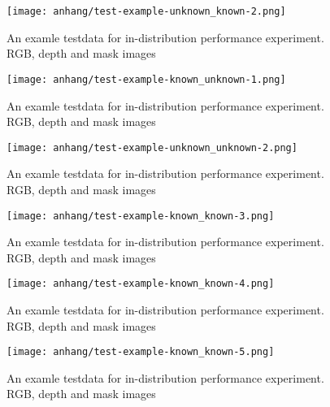 	\begin{figure}[H]
		\centering
		\texttt{[image: anhang/test-example-unknown\_known-2.png]}
		\caption[An examle testdata for in-distribution performance experiment. RGB, depth and mask images]{An examle testdata for in-distribution performance experiment. RGB, depth and mask images}
	\end{figure}
	\begin{figure}[H]
		\centering
		\texttt{[image: anhang/test-example-known\_unknown-1.png]}
		\caption[An examle testdata for in-distribution performance experiment. RGB, depth and mask images]{An examle testdata for in-distribution performance experiment. RGB, depth and mask images}
	\end{figure}
	\begin{figure}[H]
		\centering
		\texttt{[image: anhang/test-example-unknown\_unknown-2.png]}
		\caption[An examle testdata for in-distribution performance experiment. RGB, depth and mask images]{An examle testdata for in-distribution performance experiment. RGB, depth and mask images}
	\end{figure}
	
	
	
	
	
	\iffalse
	
	\begin{figure}[H]
		\centering
		\texttt{[image: anhang/test-example-known\_known-3.png]}
		\caption[An examle testdata for in-distribution performance experiment. RGB, depth and mask images]{An examle testdata for in-distribution performance experiment. RGB, depth and mask images}
	\end{figure}
	\begin{figure}[H]
		\centering
		\texttt{[image: anhang/test-example-known\_known-4.png]}
		\caption[An examle testdata for in-distribution performance experiment. RGB, depth and mask images]{An examle testdata for in-distribution performance experiment. RGB, depth and mask images}
	\end{figure}
	\begin{figure}[H]
		\centering
		\texttt{[image: anhang/test-example-known\_known-5.png]}
		\caption[An examle testdata for in-distribution performance experiment. RGB, depth and mask images]{An examle testdata for in-distribution performance experiment. RGB, depth and mask images}
	\end{figure}
	
